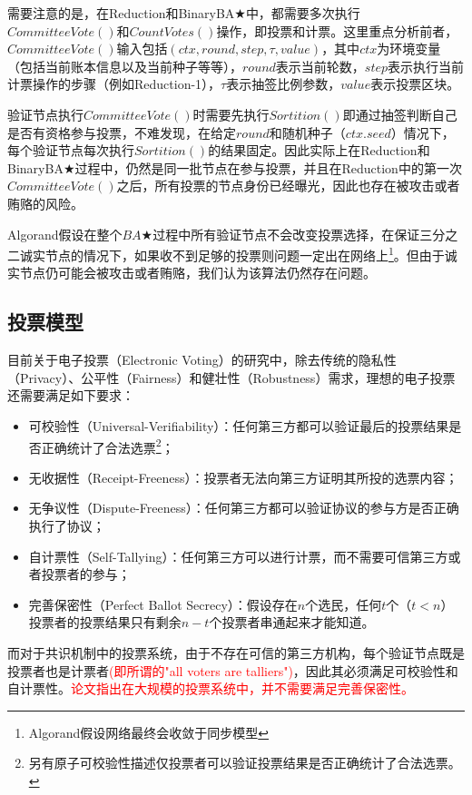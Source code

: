 需要注意的是，在Reduction和BinaryBA$\bigstar$中，都需要多次执行$CommitteeVote()$和$CountVotes()$操作，即投票和计票。这里重点分析前者，$CommitteeVote()$输入包括$(ctx,round,step,\tau,value)$，其中$ctx$为环境变量（包括当前账本信息以及当前种子等等），$round$表示当前轮数，$step$表示执行当前计票操作的步骤（例如Reduction-1），$\tau$表示抽签比例参数，$value$表示投票区块。

验证节点执行$CommitteeVote()$时需要先执行$Sortition()$即通过抽签判断自己是否有资格参与投票，不难发现，在给定$round$和随机种子（$ctx.seed$）情况下，每个验证节点每次执行$Sortition()$的结果固定。因此实际上在Reduction和BinaryBA$\bigstar$过程中，仍然是同一批节点在参与投票，并且在Reduction中的第一次$CommitteeVote()$之后，所有投票的节点身份已经曝光，因此也存在被攻击或者贿赂的风险。

Algorand假设在整个$BA\bigstar$过程中所有验证节点不会改变投票选择，在保证三分之二诚实节点的情况下，如果收不到足够的投票则问题一定出在网络上\footnote{Algorand假设网络最终会收敛于同步模型}。但由于诚实节点仍可能会被攻击或者贿赂，我们认为该算法仍然存在问题。


\subsection{投票模型}
目前关于电子投票（Electronic Voting）的研究中\cite{kiayias2002self}，除去传统的隐私性（Privacy）、公平性（Fairness）和健壮性（Robustness）需求，理想的电子投票还需要满足如下要求：
\begin{itemize}
	\item 可校验性（Universal-Verifiability）：任何第三方都可以验证最后的投票结果是否正确统计了合法选票\footnote{另有原子可校验性描述仅投票者可以验证投票结果是否正确统计了合法选票。}；
	\item 无收据性（Receipt-Freeness）：投票者无法向第三方证明其所投的选票内容；
	\item 无争议性（Dispute-Freeness）：任何第三方都可以验证协议的参与方是否正确执行了协议；
	\item 自计票性（Self-Tallying）：任何第三方可以进行计票，而不需要可信第三方或者投票者的参与；
	\item 完善保密性（Perfect Ballot Secrecy）：假设存在$n$个选民，任何$t$个（$t<n$）投票者的投票结果只有剩余$n-t$个投票者串通起来才能知道。
\end{itemize}

而对于共识机制中的投票系统，由于不存在可信的第三方机构，每个验证节点既是投票者也是计票者\textcolor{red}{(即所谓的"all voters are talliers")}，因此其必须满足可校验性和自计票性。\textcolor{red}{论文\cite{kiayias2002self}指出在大规模的投票系统中，并不需要满足完善保密性。}

